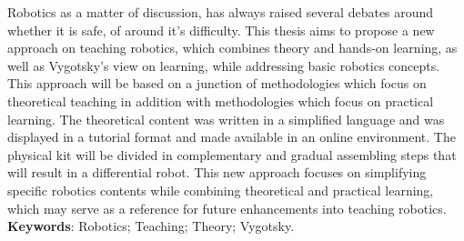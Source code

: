 \begin{thesisabastract}
Robotics as a matter of discussion, has always raised several debates around whether it is safe, of around it's difficulty. This thesis aims to propose a new approach on teaching robotics, which combines theory and hands-on learning, as well as Vygotsky's view on learning, while addressing basic robotics concepts. This approach will be based on a junction of methodologies which focus on theoretical teaching in addition with methodologies which focus on practical learning. The theoretical content was written in a simplified language and was displayed in a tutorial format and made available in an online environment. The physical kit will be divided in complementary and gradual assembling steps that will result in a differential robot. This new approach focuses on simplifying specific robotics contents while combining theoretical and practical learning, which may serve as a reference for future enhancements into teaching robotics.
\ \\

\textbf{Keywords}: Robotics; Teaching; Theory; Vygotsky.

\end{thesisabastract}
